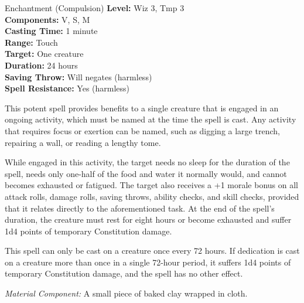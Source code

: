 {Enchantment (Compulsion)}
{
	\textbf{Level:}
	Wiz 3, Tmp 3\\
	\textbf{Components:}
	V, S, M\\
	\textbf{Casting Time:}
	1 minute\\
	\textbf{Range:}
	Touch\\
	\textbf{Target:}
	One creature\\
	\textbf{Duration:}
	24 hours\\
	\textbf{Saving Throw:}
	Will negates (harmless)\\
	\textbf{Spell Resistance:}
	Yes (harmless)\\
}
{
	This potent spell provides benefits to a single creature that is engaged in an ongoing activity, which must be named at the time the spell is cast. Any activity that requires focus or exertion can be named, such as digging a large trench, repairing a wall, or reading a lengthy tome.

	While engaged in this activity, the target needs no sleep for the duration of the spell, needs only one-half of the food and water it normally would, and cannot becomes exhausted or fatigued. The target also receives a +1 morale bonus on all attack rolls, damage rolls, saving throws, ability checks, and skill checks, provided that it relates directly to the aforementioned task. At the end of the spell's duration, the creature must rest for eight hours or become exhausted and suffer 1d4 points of temporary Constitution damage.

	This spell can only be cast on a creature once every 72 hours. If dedication is cast on a creature more than once in a single 72-hour period, it suffers 1d4 points of temporary Constitution damage, and the spell has no other effect.

	\textit{Material Component:} A small piece of baked clay wrapped in cloth.
}
